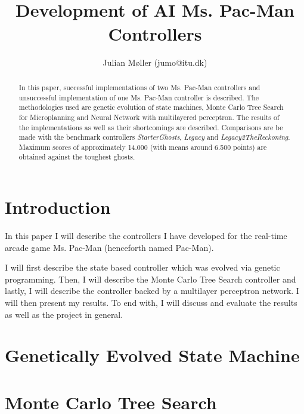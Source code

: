 \documentclass[conference]{IEEEtran}
\begin{document}
\title{\ \\ \LARGE\bf Development of AI Ms. Pac-Man Controllers}

\author{Julian Møller (jumo@itu.dk)}


\maketitle

\begin{abstract}
In this paper, successful implementations of two Ms. Pac-Man controllers and unsuccessful implementation of one Ms. Pac-Man controller is described. The methodologies used are genetic evolution of state machines, Monte Carlo Tree Search for Microplanning and Neural Network with multilayered perceptron.
The results of the implementations as well as their shortcomings are described. Comparisons are be made with the benchmark controllers
\emph{StarterGhosts}, \emph{Legacy} and \emph{Legacy2TheReckoning}. Maximum scores of approximately 14.000 (with means around 6.500 points)
are obtained against the toughest ghosts.
\end{abstract}


\section{Introduction}
In this paper I will describe the controllers I have developed for the real-time arcade game Ms. Pac-Man (henceforth named Pac-Man).

I will first describe the state based controller which was evolved via genetic programming. Then, I will describe the Monte Carlo Tree
Search controller and lastly, I will describe the controller backed by a multilayer perceptron network. I will then present my results. To end with, I will discuss and evaluate the results as well as the project in general.


\section{Genetically Evolved State Machine}


\section{Monte Carlo Tree Search}

\end{document}
